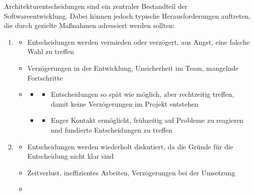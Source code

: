 \begin{infoBox}[title=Entscheidungen zur Architektur: Herausforderungen und Lösungen]
    Architekturentscheidungen sind ein zentraler Bestandteil der Softwareentwicklung. Dabei können jedoch typische Herausforderungen auftreten, die durch gezielte Maßnahmen adressiert werden sollten:
    \begin{enumerate}
        \item {}
        \begin{itemize}
            \item {} Entscheidungen werden vermieden oder verzögert, aus Angst, eine falsche Wahl zu treffen
            \item {} Verzögerungen in der Entwicklung, Unsicherheit im Team, mangelnde Fortschritte
            \item {}
            \begin{itemize}
                \item {}
                \begin{itemize}
                    \item Entscheidungen so spät wie möglich, aber rechtzeitig treffen, damit keine Verzögerungen im Projekt entstehen
                \end{itemize}
                \item {}
                \begin{itemize}
                    \item Enger Kontakt ermöglicht, frühzeitig auf Probleme zu reagieren und fundierte Entscheidungen zu treffen
                \end{itemize}
            \end{itemize}
        \end{itemize}
        \item {}
        \begin{itemize}
            \item {} Entscheidungen werden wiederholt diskutiert, da die Gründe für die Entscheidung nicht klar sind
            \item {} Zeitverlust, ineffizientes Arbeiten, Verzögerungen bei der Umsetzung
            \item {}
            \begin{itemize}

\end{itemize}
\end{itemize}
\end{enumerate}
\end{infoBox}
